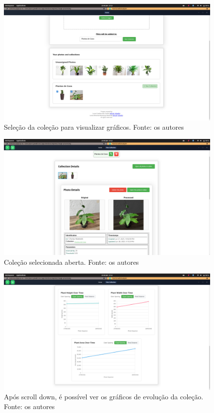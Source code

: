 \begin{figure}[H]
    \centering
    \includegraphics[width=1\textwidth]{../figures/screens/uc014/Screenshot from 2025-06-28 17-13-06.png}
    \caption{Seleção da coleção para visualizar gráficos. Fonte: os autores}
    \label{fig:uc014-screen2}
\end{figure}

\begin{figure}[H]
    \centering
    \includegraphics[width=1\textwidth]{../figures/screens/uc014/Screenshot from 2025-06-28 17-13-29.png}
    \caption{Coleção selecionada aberta. Fonte: os autores}
    \label{fig:uc014-screen3}
\end{figure}

\begin{figure}[H]
    \centering
    \includegraphics[width=1\textwidth]{../figures/screens/uc014/Screenshot from 2025-06-28 17-13-38.png}
    \caption{Após scroll down, é possível ver os gráficos de evolução da coleção. Fonte: os autores}
    \label{fig:uc014-screen4}
\end{figure}
